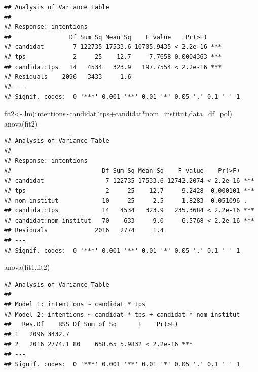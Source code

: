 \documentclass[
]{book}
\newenvironment{Shaded}{\begin{snugshade}}{\end{snugshade}}
\newcommand{\AttributeTok}[1]{\textcolor[rgb]{0.77,0.63,0.00}{#1}}
\newcommand{\FunctionTok}[1]{\textcolor[rgb]{0.00,0.00,0.00}{#1}}
\newcommand{\NormalTok}[1]{#1}
\newcommand{\OtherTok}[1]{\textcolor[rgb]{0.56,0.35,0.01}{#1}}
\newcommand{\SpecialCharTok}[1]{\textcolor[rgb]{0.00,0.00,0.00}{#1}}
\begin{document}
\begin{verbatim}
## Analysis of Variance Table
## 
## Response: intentions
##                Df Sum Sq Mean Sq    F value    Pr(>F)    
## candidat        7 122735 17533.6 10705.9435 < 2.2e-16 ***
## tps             2     25    12.7     7.7658 0.0004363 ***
## candidat:tps   14   4534   323.9   197.7554 < 2.2e-16 ***
## Residuals    2096   3433     1.6                         
## ---
## Signif. codes:  0 '***' 0.001 '**' 0.01 '*' 0.05 '.' 0.1 ' ' 1
\end{verbatim}

\begin{Shaded}
\begin{Highlighting}[]
\NormalTok{fit2}\OtherTok{\textless{}{-}} \FunctionTok{lm}\NormalTok{(intentions}\SpecialCharTok{\textasciitilde{}}\NormalTok{candidat}\SpecialCharTok{*}\NormalTok{tps}\SpecialCharTok{+}\NormalTok{candidat}\SpecialCharTok{*}\NormalTok{nom\_institut,}\AttributeTok{data=}\NormalTok{df\_pol)}
\FunctionTok{anova}\NormalTok{(fit2)}
\end{Highlighting}
\end{Shaded}

\begin{verbatim}
## Analysis of Variance Table
## 
## Response: intentions
##                         Df Sum Sq Mean Sq    F value    Pr(>F)    
## candidat                 7 122735 17533.6 12742.2074 < 2.2e-16 ***
## tps                      2     25    12.7     9.2428  0.000101 ***
## nom_institut            10     25     2.5     1.8283  0.051096 .  
## candidat:tps            14   4534   323.9   235.3684 < 2.2e-16 ***
## candidat:nom_institut   70    633     9.0     6.5768 < 2.2e-16 ***
## Residuals             2016   2774     1.4                         
## ---
## Signif. codes:  0 '***' 0.001 '**' 0.01 '*' 0.05 '.' 0.1 ' ' 1
\end{verbatim}

\begin{Shaded}
\begin{Highlighting}[]
\FunctionTok{anova}\NormalTok{(fit1,fit2)}
\end{Highlighting}
\end{Shaded}

\begin{verbatim}
## Analysis of Variance Table
## 
## Model 1: intentions ~ candidat * tps
## Model 2: intentions ~ candidat * tps + candidat * nom_institut
##   Res.Df    RSS Df Sum of Sq      F    Pr(>F)    
## 1   2096 3432.7                                  
## 2   2016 2774.1 80    658.65 5.9832 < 2.2e-16 ***
## ---
## Signif. codes:  0 '***' 0.001 '**' 0.01 '*' 0.05 '.' 0.1 ' ' 1
\end{verbatim}
\end{document}
